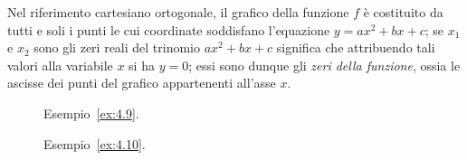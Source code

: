 Nel riferimento cartesiano ortogonale, il grafico della funzione $f$ è costituito da tutti e soli i punti le cui coordinate soddisfano l'equazione $y=ax^2+bx+c$; se $x_1$ e $x_2$ sono gli zeri reali del trinomio $ax^2+bx+c$ significa che attribuendo tali valori alla variabile $x$ si ha $y=0$; essi sono dunque gli \emph{zeri della funzione}, ossia le ascisse dei punti del grafico appartenenti all'asse $x$.

\begin{figure}[b]
 \begin{minipage}[t]{.45\textwidth}
\centering
 
\caption{Esempio~\ref{ex:4.9}.}\label{fig:4.1}
 \end{minipage}\hfil
 \begin{minipage}[t]{.45\textwidth}
\centering
 
\caption{Esempio~\ref{ex:4.10}.}\label{fig:4.2}
 \end{minipage}
\end{figure}

